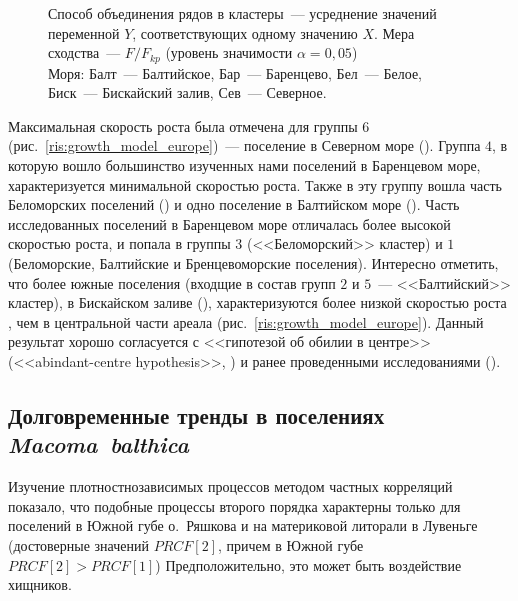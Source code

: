 {{\begin{figure}[ht]
{Способ объединения рядов в кластеры~--- усреднение значений переменной $Y$, соответствующих одному значению $X$.
Мера сходства~--- $F/F_{kp}$ (уровень значимости $\alpha = 0,05$)\\
Моря: Балт~--- Балтийское, Бар~--- Баренцево, Бел~--- Белое, Биск~--- Бискайский залив, Сев~--- Северное.}
		\label{ris:growth_cluster_literature}
	\end{figure}
Максимальная скорость роста была отмечена для группы $6$ (рис.~\ref{ris:growth_model_europe})~--- поселение в Северном море (\cite{Vogel_1959}). 
Группа $4$, в которую вошло большинство изученных нами поселений в Баренцевом море, характеризуется минимальной скоростью роста.
Также в эту группу вошла часть Беломорских поселений (\cite{Semenova_1970}) и одно поселение в Балтийском море (\cite{Bergh_1974}).
Часть исследованных поселений в Баренцевом море отличалась более высокой скоростью роста, и попала в группы $3$ (<<Беломорский>> кластер) и $1$ (Беломорские, Балтийские и Бренцевоморские поселения).
Интересно отметить, что более южные поселения (входщие в состав групп $2$ и $5$~--- <<Балтийский>> кластер), в Бискайском заливе (\cite{Bachelet_1980}), характеризуются более низкой скоростью роста , чем в центральной части ареала (рис.~\ref{ris:growth_model_europe}).
Данный результат хорошо согласуется с <<гипотезой об обилии в центре>> (<<abindant-centre hypothesis>>, \cite{Sagarin_et_al_2006}) и ранее проведенными исследованиями (\cite{Beukema_Meehan_1985, Hummel_et_al_1998}).

\subsection*{Долговременные тренды в поселениях \textit{Macoma~balthica}}
Изучение плотностнозависимых процессов методом частных корреляций показало, что подобные процессы второго порядка характерны только для поселений в Южной губе о.~Ряшкова и на материковой литорали в Лувеньге (достоверные значений $PRCF[2]$, причем в Южной губе $PRCF[2] > PRCF[1]$)
Предположительно, это может быть воздействие хищников.

}}
